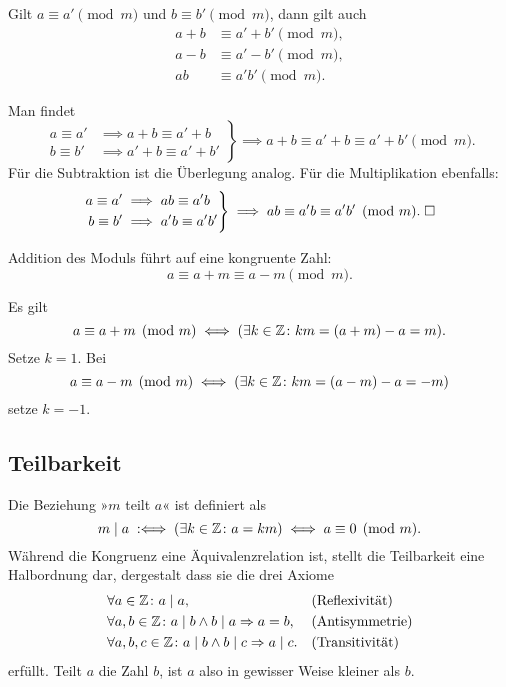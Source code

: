 \begin{Satz}
Gilt $a\equiv a'\pmod{m}$ und
$b\equiv b'\pmod{m}$, dann gilt auch
\begin{align*}
a+b&\equiv a'+b'\pmod{m},\\
a-b&\equiv a'-b'\pmod{m},\\
ab&\equiv a'b'\pmod{m}.
\end{align*}
\end{Satz}
 Man findet
\begin{equation}
\left.\begin{aligned}
a\equiv a'&\implies a+b\equiv a'+b\\
b\equiv b'&\implies a'+b\equiv a'+b'
\end{aligned}\right\}
\implies a+b\equiv a'+b\equiv a'+b'\pmod{m}.
\end{equation}
Für die Subtraktion ist die Überlegung analog. Für die Multiplikation
ebenfalls:%
\begin{equation}
\left.\begin{aligned}
a\equiv a'&\implies ab\equiv a'b\\
b\equiv b'&\implies a'b\equiv a'b'
\end{aligned}\right\}
\implies ab\equiv a'b\equiv a'b'\pmod{m}.\;\Box
\end{equation}

\begin{Satz}
Addition des Moduls führt auf eine kongruente Zahl:%
\[a\equiv a+m\equiv a-m\pmod{m}.\]
\end{Satz}
\begin{Beweis}
Es gilt
\[a\equiv a+m\pmod{m}\iff (\exists k\in\mathbb Z\colon km=(a+m)-a=m).\]
Setze $k=1$. Bei
\[a\equiv a-m\pmod{m}\iff (\exists k\in\mathbb Z\colon km=(a-m)-a=-m)\]
setze $k=-1$.\;\qedsymbol
\end{Beweis}

\subsection{Teilbarkeit}

Die Beziehung »$m$ teilt $a$« ist definiert als
\[m\mid a\;:\Longleftrightarrow\; (\exists k\in\mathbb Z\colon a=km) \iff a\equiv 0\pmod{m}.\]
Während die Kongruenz eine Äquivalenzrelation ist, stellt die
Teilbarkeit eine Halbordnung dar, dergestalt dass sie die drei Axiome
\begin{align*}
&\forall a\in\mathbb Z\colon a\mid a, &&\text{(Reflexivität)}\\
&\forall a,b\in\mathbb Z\colon a\mid b\land b\mid a\Rightarrow a = b,&&\text{(Antisymmetrie)}\\
&\forall a,b,c\in\mathbb Z\colon a\mid b\land b\mid c\Rightarrow a\mid c.&&\text{(Transitivität)}
\end{align*}
erfüllt. Teilt $a$ die Zahl $b$, ist $a$ also in gewisser Weise kleiner
als $b$.

